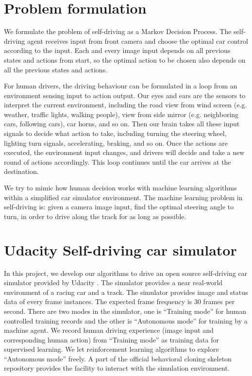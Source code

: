 \documentclass[a4paper]{article}
\begin{document}
\section{Problem formulation}

We formulate the problem of self-driving as a Markov Decision Process. The self-driving agent receives input from front camera and choose the optimal car control according to the input. Each and every image input depends on all previous states and actions from start, so the optimal action to be chosen also depends on all the previous states and actions.

For human drivers, the driving behaviour can be formulated in a loop from an environment sensing
input to action output. Our eyes and ears are the sensors to interpret the current environment,
including the road view from wind screen (e.g. weather, traffic lights, walking people), view
from side mirror (e.g. neighboring cars, following cars), car horns, and so on. Then our brain
takes all these input signals to decide what action to take, including turning the
steering wheel, lighting turn signals, accelerating, braking, and so on. Once the actions are
executed, the environment input changes, and drivers will decide and take a new round of
actions accordingly. This loop continues until the car arrives at the destination. 

We try to mimic how human decision works with machine learning algorithms within a simplified car simulator environment. The machine learning problem in self-driving is: given a camera image input, find the optimal steering angle to turn, in order to drive along the track for as long as possible.


\section{Udacity Self-driving car simulator}

In this project, we develop our algorithms to drive an open source self-driving car simulator provided by Udacity \cite{selfdrivingsimulator}. The simulator provides a near real-world environment of a racing car and a track. The simulator provides image and status data of every frame instances. The expected frame frequency is 30 frames per second. There are two modes in the simulator, one is ``Training mode'' for human controlled training records and the other is ``Autonomous mode'' for training by a machine agent. We record human driving experience (image input and corresponding human action) from ``Training mode'' as training data for supervised learning. We let reinforcement learning algorithms to explore ``Autonomous mode'' freely. A part of the official behavioral cloning skeleton repository \cite{carndbehavioralcloning} provides the facility to interact with the simulation environment. 
\end{document}
